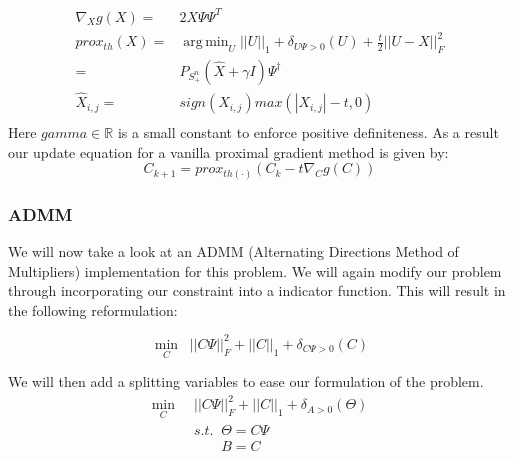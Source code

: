 \documentclass[12pt, letterpaper]{article}
\DeclareMathOperator*{\argmin}{arg\,min}
\begin{document}
	\begin{align*}
		\nabla_{X} g(X) =& 2X\Psi\Psi^{T}\\
		prox_{th}(X) =& \argmin_{U} ||U||_{1} + \delta_{U\Psi>0}(U)+ \frac{t}{2}||U-X||_{F}^{2}\\
		             =& P_{S_{+}^{n}}\left(\hat{X}+\gamma I\right)\Psi^{\dagger}\\
            \hat{X}_{i,j}  =& sign(X_{i,j})max(|X_{i,j}|-t,0) \\
	\end{align*}
	Here $gamma \in \mathbb{R}$ is a small constant to enforce positive definiteness. As a result our update equation for a vanilla proximal gradient method is given by:
	\[C_{k+1} = prox_{th(\cdot)}\left(C_{k}-t\nabla_{C}g(C)\right)\]
	 
	\subsubsection{ADMM}
	We will now take a look at an ADMM (Alternating Directions Method of Multipliers) implementation for this problem. We will again modify our problem through incorporating our constraint into a indicator function. This will result in the following reformulation:
	
	\[	\min_{C} \;\; ||C\Psi||_{F}^{2} + ||C||_{1} +\delta_{C\Psi > 0}(C)\]

	We will then add a splitting variables to ease our formulation of the problem.
	\begin{align*}
		\min_{C}& \;\; ||C\Psi||_{F}^{2} + ||C||_{1} +\delta_{A > 0}(\Theta)\\
				& \;\; s.t. \;\; \Theta=C\Psi \\
				& \;\;\;\;\;\;\;\;\; B = C\\
	\end{align*}
	
\end{document}
